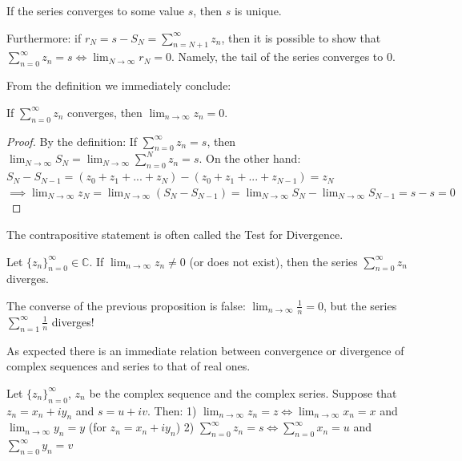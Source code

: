 \documentclass[12pt]{article}
\begin{document}
If the series converges to some value $s$, then $s$ is unique.

\begin{remark}
Furthermore: if $r_N = s - S_N = \sum_{n=N+1}^\infty z_n$, then it is possible to show that $\sum_{n=0}^\infty z_n = s \iff \lim_{N\to\infty} r_N = 0$.
Namely, the tail of the series converges to 0.
\end{remark}

From the definition we immediately conclude:

\begin{proposition}
If $\sum_{n=0}^\infty z_n$ converges, then $\lim_{n\to\infty} z_n = 0$.
\end{proposition}
\begin{proof}
By the definition: If $\sum_{n=0}^\infty z_n = s$, then $\lim_{N\to\infty} S_N = \lim_{N\to\infty} \sum_{n=0}^N z_n = s$.
On the other hand:
$S_N - S_{N-1} = (z_0 + z_1 + ... + z_N) - (z_0 + z_1 + ... + z_{N-1}) = z_N$
$\implies \lim_{N\to\infty} z_N = \lim_{N\to\infty} (S_N - S_{N-1}) = \lim_{N\to\infty} S_N - \lim_{N\to\infty} S_{N-1} = s - s = 0$
\end{proof}

The contrapositive statement is often called the Test for Divergence.

\begin{proposition}
Let $\{z_n\}_{n=0}^\infty \in \mathbb{C}$. If $\lim_{n\to\infty} z_n \neq 0$ (or does not exist), then the series $\sum_{n=0}^\infty z_n$ diverges.
\end{proposition}

\begin{remark}
The converse of the previous proposition is false: $\lim_{n\to\infty} \frac{1}{n} = 0$, but the series $\sum_{n=1}^\infty \frac{1}{n}$ diverges!
\end{remark}

As expected there is an immediate relation between convergence or divergence of complex sequences and series to that of real ones.

\begin{proposition}
Let $\{z_n\}_{n=0}^\infty$, $z_n$ be the complex sequence and the complex series. Suppose that $z_n = x_n + iy_n$ and $s = u + iv$. Then:
1) $\lim_{n\to\infty} z_n = z \iff \lim_{n\to\infty} x_n = x$ and $\lim_{n\to\infty} y_n = y$ (for $z_n = x_n + iy_n$)
2) $\sum_{n=0}^\infty z_n = s \iff \sum_{n=0}^\infty x_n = u$ and $\sum_{n=0}^\infty y_n = v$
\end{proposition}
\end{document}
